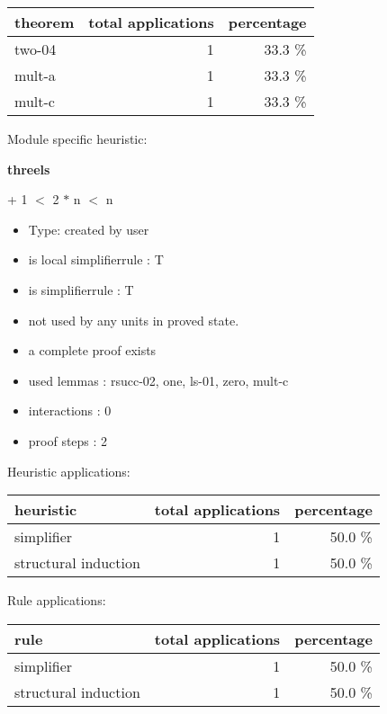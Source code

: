 \documentclass[a4paper]{article}
\begin{document}
\begin{supertabular}{l|r|r}
theorem	        & total applications & percentage \\ \hline
two-04 & 1 & 33.3 \% \\
mult-a & 1 & 33.3 \% \\
mult-c & 1 & 33.3 \% \\

\end{supertabular}

Module specific heuristic:

\pagebreak

{\LARGE\bf threels}\label{lemma-threels}

\medskip

  + 1 $<$ 2 $*$ n  $<$ n

\begin{itemize}

\item Type: created by user

\item is local simplifierrule : T
\item is simplifierrule : T
\item not used by any units in proved state.
\item       a complete proof exists
\item       used lemmas  : rsucc-02, one, ls-01, zero, mult-c
\item       interactions : 0
\item       proof steps  : 2
\end{itemize}

\medskip


Heuristic applications:

\begin{supertabular}{l|r|r}
heuristic	& total applications & percentage \\ \hline
simplifier & 1 & 50.0 \% \\
structural induction & 1 & 50.0 \% \\

\end{supertabular}

Rule applications:

\begin{supertabular}{l|r|r}
rule	        & total applications & percentage \\ \hline
simplifier & 1 & 50.0 \% \\
structural induction & 1 & 50.0 \% \\

\end{supertabular}
\end{document}
